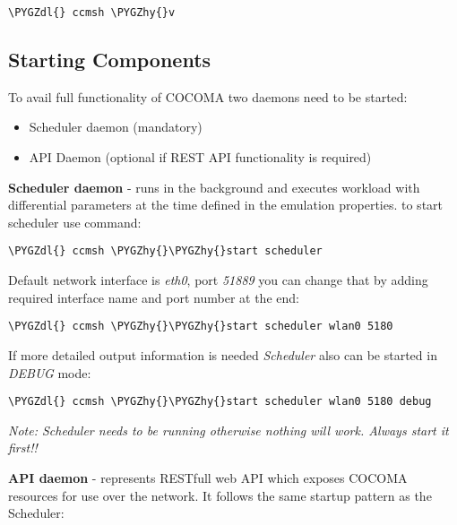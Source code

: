 \documentclass[letterpaper,10pt,english]{sphinxmanual}
\def\PYGZdl{\char`\$}
\def\PYGZhy{\char`\-}
\begin{document}
\begin{Verbatim}[commandchars=\\\{\}]
\PYGZdl{} ccmsh \PYGZhy{}v
\end{Verbatim}


\subsection{Starting Components}
\label{01_how_to_use_it:starting-components}
To avail full functionality of COCOMA two daemons need to be started:
\begin{itemize}
\item {} 
Scheduler daemon (mandatory)

\item {} 
API Daemon (optional if REST API functionality is required)

\end{itemize}

\textbf{Scheduler daemon} - runs in the background and executes workload with differential parameters at the time defined in the emulation properties.
to start scheduler use command:

\begin{Verbatim}[commandchars=\\\{\}]
\PYGZdl{} ccmsh \PYGZhy{}\PYGZhy{}start scheduler
\end{Verbatim}

Default network interface is \emph{eth0}, port \emph{51889} you can change that by adding required interface name and port number at the end:

\begin{Verbatim}[commandchars=\\\{\}]
\PYGZdl{} ccmsh \PYGZhy{}\PYGZhy{}start scheduler wlan0 5180
\end{Verbatim}

If more detailed output information is needed \emph{Scheduler} also can be started in \emph{DEBUG} mode:

\begin{Verbatim}[commandchars=\\\{\}]
\PYGZdl{} ccmsh \PYGZhy{}\PYGZhy{}start scheduler wlan0 5180 debug
\end{Verbatim}

\emph{Note: Scheduler needs to be running otherwise nothing will work. Always start it first!!}

\textbf{API daemon} - represents RESTfull web API which exposes COCOMA resources for use over the network. It follows the same startup pattern as the Scheduler:
\end{document}
